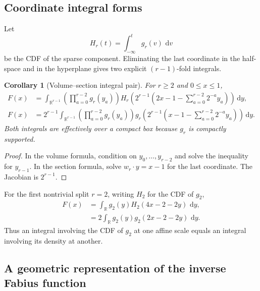 \documentclass[11pt,oneside]{article}
\numberwithin{equation}{section}
\newtheorem{corollary}[theorem]{Corollary}
\theoremstyle{definition}
\theoremstyle{remark}
\newcommand{\R}{\mathbb R}
\newcommand{\dd}{\,\mathrm d}
\begin{document}
\subsection{Coordinate integral forms}

Let
\begin{equation}
 H_r(t)=\int_{-\infty}^{t}g_r(v)\,\dd v                    \label{eq:Hr-cdf}
\end{equation}
be the CDF of the sparse component.  Eliminating the last coordinate in the
half-space and in the hyperplane gives two explicit $(r-1)$-fold integrals.

\begin{corollary}[Volume--section integral pair]
\label{cor:coordinate-section}
For $r\ge2$ and $0\le x\le1$,
\begin{align}
 F(x)
 &=\int_{\R^{r-1}}
   \left(\prod_{a=0}^{r-2}g_r(y_a)\right)
   H_r\!\left(2^{r-1}\left(2x-1-
      \sum_{a=0}^{r-2}2^{-a}y_a\right)\right)\dd y,       \label{eq:F-volume-coordinates}\\
 F(x)
 &=2^{r-1}\int_{\R^{r-1}}
   \left(\prod_{a=0}^{r-2}g_r(y_a)\right)
   g_r\!\left(2^{r-1}\left(x-1-
      \sum_{a=0}^{r-2}2^{-a}y_a\right)\right)\dd y.       \label{eq:F-section-coordinates}
\end{align}
Both integrals are effectively over a compact box because $g_r$ is compactly
supported.
\end{corollary}

\begin{proof}
In the volume formula, condition on $y_0,\ldots,y_{r-2}$ and solve the inequality
for $y_{r-1}$.  In the section formula, solve
$w_r\cdot y=x-1$ for the last coordinate.  The Jacobian is $2^{r-1}$.
\end{proof}

For the first nontrivial split $r=2$, writing $H_2$ for the CDF of $g_2$,
\begin{align}
 F(x)
 &=\int_{\R}g_2(y)H_2(4x-2-2y)\,\dd y,                    \label{eq:r2-volume}\\
 &=2\int_{\R}g_2(y)g_2(2x-2-2y)\,\dd y.                  \label{eq:r2-section}
\end{align}
Thus an integral involving the CDF of $g_2$ at one affine scale equals an
integral involving its density at another.

\subsection{A geometric representation of the inverse Fabius function}
\end{document}
